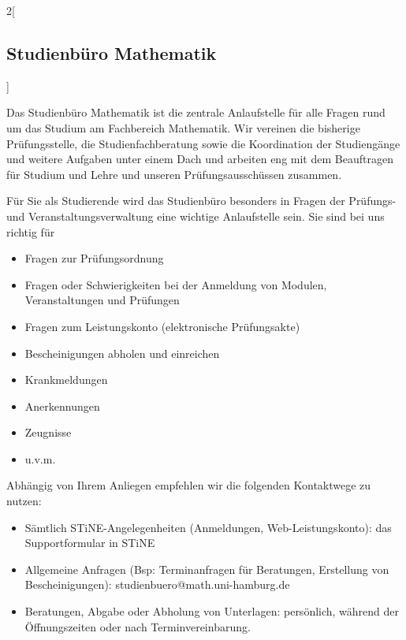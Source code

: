 \begin{multicols}{2}[\subsection{Studienbüro Mathematik}] \label{studienburo}

Das Studienbüro Mathematik ist die zentrale Anlaufstelle für alle Fragen rund
um das Studium am Fachbereich Mathematik. Wir vereinen die bisherige
Prüfungsstelle, die Studienfachberatung sowie die Koordination der Studiengänge
und weitere Aufgaben unter einem Dach und arbeiten eng mit dem Beauftragen für
Studium und Lehre und unseren Prüfungsausschüssen zusammen. 

Für Sie als Studierende wird das Studienbüro besonders in Fragen der Prüfungs-
und Veranstaltungsverwaltung eine wichtige Anlaufstelle sein. Sie sind bei uns
richtig für

\begin{itemize}\itemsep 0pt
    \item Fragen zur Prüfungsordnung 
    \item Fragen oder Schwierigkeiten bei der Anmeldung von Modulen,
          Veranstaltungen und Prüfungen
    \item Fragen zum Leistungskonto (elektronische Prüfungsakte)
    \item Bescheinigungen abholen und einreichen
    \item Krankmeldungen
    \item Anerkennungen
    \item Zeugnisse
    \item u.v.m.
\end{itemize}

Abhängig von Ihrem Anliegen empfehlen wir die folgenden Kontaktwege zu nutzen:

\begin{itemize}\itemsep 0pt
    \item Sämtlich STiNE-Angelegenheiten (Anmeldungen,
          Web-Leistungskonto): das Supportformular in STiNE
    \item Allgemeine Anfragen (Bsp: Terminanfragen für Beratungen, Erstellung
          von Bescheinigungen): studienbuero@math.uni-hamburg.de
    \item Beratungen, Abgabe oder Abholung von Unterlagen: persönlich, während
          der Öffnungszeiten oder nach Terminvereinbarung. 
\end{itemize}

\columnbreak


\end{multicols}
